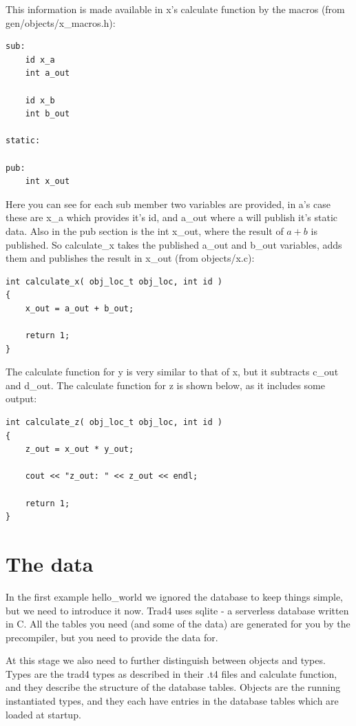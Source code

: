 \documentclass{report}
\begin{document}
This information is made available in x's calculate function by the macros (from gen/objects/x_macros.h):

\begin{verbatim}
sub:
    id x_a
    int a_out

    id x_b
    int b_out

static:

pub:
    int x_out
\end{verbatim}

Here you can see for each sub member two variables are provided, in a's case these are x_a which provides it's id, and a_out where a will publish it's static data. Also in the pub section is the int x_out, where the result of  \(a + b\) is published. So calculate_x takes the published a_out and b_out variables, adds them and publishes the result in x_out (from objects/x.c):

\begin{verbatim}
int calculate_x( obj_loc_t obj_loc, int id )
{
    x_out = a_out + b_out;

    return 1;
}
\end{verbatim}

The calculate function for y is very similar to that of x, but it subtracts c_out and d_out. The calculate function for z is shown below, as it includes some output:

\begin{verbatim}
int calculate_z( obj_loc_t obj_loc, int id )
{
    z_out = x_out * y_out;

    cout << "z_out: " << z_out << endl;

    return 1;
}
\end{verbatim}

\section{The data}
\label{sec:The data}

In the first example hello_world we ignored the database to keep things simple, but we need to introduce it now. Trad4 uses sqlite - a serverless database written in C. All the tables you need (and some of the data) are generated for you by the precompiler, but you need to provide the data for.

At this stage we also need to further distinguish between objects and types. Types are the trad4 types as described in their .t4 files and calculate function, and they describe the structure of the database tables. Objects are the running instantiated types, and they each have entries in the database tables which are loaded at startup.
\end{document}
